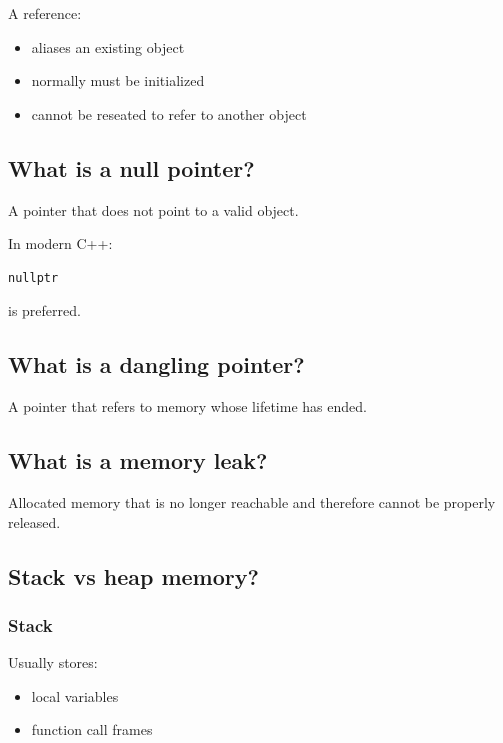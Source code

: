 A reference:

\begin{itemize}
  \item aliases an existing object
  \item normally must be initialized
  \item cannot be reseated to refer to another object
\end{itemize}

\medskip

\subsection{What is a null pointer?}

A pointer that does not point to a valid object.

In modern C++:

\begin{lstlisting}
nullptr
\end{lstlisting}

is preferred.

\medskip

\subsection{What is a dangling pointer?}

A pointer that refers to memory whose lifetime has ended.

\medskip

\subsection{What is a memory leak?}

Allocated memory that is no longer reachable and therefore cannot be properly released.

\medskip

\subsection{Stack vs heap memory?}

\subsubsection{Stack}

Usually stores:

\begin{itemize}
  \item local variables
  \item function call frames
\end{itemize}

